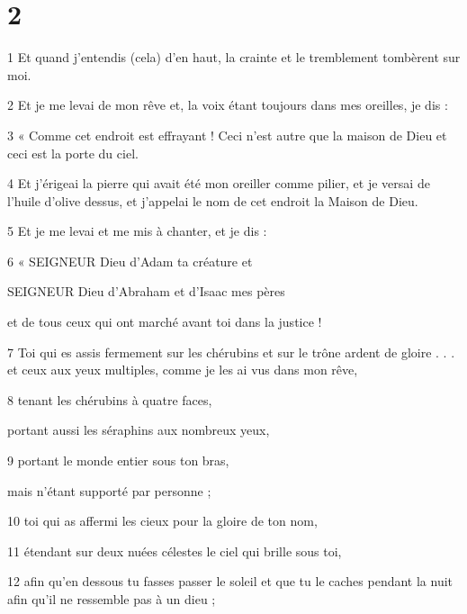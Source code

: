 \chapter{2}

\par 1 Et quand j'entendis (cela) d'en haut, la crainte et le tremblement tombèrent sur moi.

\par 2 Et je me levai de mon rêve et, la voix étant toujours dans mes oreilles, je dis :

\par 3 « Comme cet endroit est effrayant ! Ceci n’est autre que la maison de Dieu et ceci est la porte du ciel.

\par 4 Et j'érigeai la pierre qui avait été mon oreiller comme pilier, et je versai de l'huile d'olive dessus, et j'appelai le nom de cet endroit la Maison de Dieu.

\par 5 Et je me levai et me mis à chanter, et je dis :

\par 6 « SEIGNEUR Dieu d'Adam ta créature et
\par SEIGNEUR Dieu d'Abraham et d'Isaac mes pères
\par et de tous ceux qui ont marché avant toi dans la justice !

\par 7 Toi qui es assis fermement sur les chérubins et sur le trône ardent de gloire . . . et ceux aux yeux multiples, comme je les ai vus dans mon rêve,

\par 8 tenant les chérubins à quatre faces,
\par portant aussi les séraphins aux nombreux yeux,

\par 9 portant le monde entier sous ton bras,
\par mais n'étant supporté par personne ;

\par 10 toi qui as affermi les cieux pour la gloire de ton nom,

\par 11 étendant sur deux nuées célestes le ciel qui brille sous toi,

\par 12 afin qu'en dessous tu fasses passer le soleil et que tu le caches pendant la nuit afin qu'il ne ressemble pas à un dieu ;

